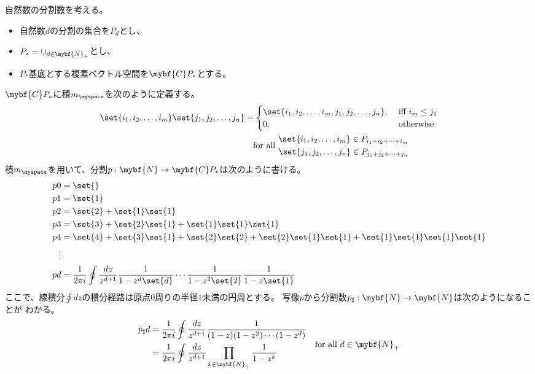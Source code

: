 	自然数の分割数を考える。
	\begin{itemize}\setlength{\itemsep}{-1mm} %
		\item 自然数$d$の分割の集合を$P_d$とし、
		\item $P_*=\cup_{d\in\mybf{N}_+}$とし、
		\item $P_*$基底とする複素ベクトル空間を$\mybf{C}P_*$とする。
	\end{itemize} %
	$\mybf{C}P_*$に積$m_\myspace$を次のように定義する。
	\begin{equation*}\begin{split} %
		\set{i_1,i_2,\dots,i_m}\set{j_1,j_2,\dots,j_n}
		&= \begin{cases}
			\set{i_1,i_2,\dots,i_m,j_1,j_2,\dots,j_n}, &\text{ iff }i_m\le j_1 \\
			0, &\text{ otherwise } \\
		\end{cases} \\
		&\quad\text{for all }\begin{split}
			\set{i_1,i_2,\dots,i_m}\in P_{i_1+i_2+\cdots+i_m} \\
			\set{j_1,j_2,\dots,j_n}\in P_{j_1+j_2+\cdots+j_n} \\
		\end{split}
	\end{split}\end{equation*} %
	積$m_\myspace$を用いて、分割$p:\mybf{N}\to\mybf{C}P_*$は次のように書ける。
	\begin{equation*}\begin{split} %
		p0 &= \set{} \\
		p1 &= \set{1} \\
		p2 &= \set{2}+\set{1}\set{1} \\
		p3 &= \set{3}+\set{2}\set{1}+\set{1}\set{1}\set{1} \\
		p4 &= \set{4}+\set{3}\set{1}+\set{2}\set{2}+\set{2}\set{1}\set{1}
			+\set{1}\set{1}\set{1}\set{1} \\
		\vdots \\
		pd &= \frac{1}{2\pi i}\oint\frac{dz}{z^{d+1}}
			\frac{1}{1-z^d\set{d}}\cdots
			\frac{1}{1-z^2\set{2}}\frac{1}{1-z\set{1}} \\
	\end{split}\end{equation*} %
	ここで、線積分$\oint dz$の積分経路は原点$0$周りの半径$1$未満の円周とする。
	写像$p$から分割数$p_\sharp:\mybf{N}\to\mybf{N}$は次のようになることが
	わかる。
	\begin{equation*}
		\begin{split}
		p_\sharp d &= \frac{1}{2\pi i}\oint\frac{dz}{z^{d+1}}
				\frac{1}{(1-z)(1-z^2)\cdots(1-z^d)} \\
		&= \frac{1}{2\pi i}\oint\frac{dz}{z^{d+1}}
			\prod_{k\in\mybf{N}_+}\frac{1}{1-z^k} \\
		\end{split}
		\quad\text{for all }d\in\mybf{N}_+
	\end{equation*} %

